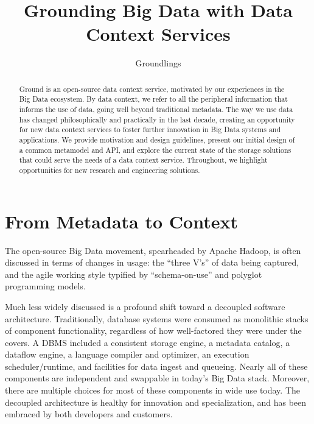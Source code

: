 \documentclass{sig-alternate}
\begin{document}
\newcommand{\smallitem}[1]{\vspace{1em}\noindent\textbf{#1}}
\newcommand{\smallitembot}{\vspace{1em}\noindent}



\title{Grounding Big Data with Data Context Services}
\author{
Groundlings
}

\maketitle

\begin{abstract}
Ground is an open-source data context service, motivated by our experiences in the Big Data ecosystem. By data context, we refer to all the peripheral information that informs the use of data, going well beyond traditional metadata.
The way we use data has changed philosophically and practically in the last decade, creating an opportunity for new data context services to foster further innovation in Big Data systems and applications. We provide motivation and design guidelines, present our initial design of a common metamodel and API, and explore the current state of the storage solutions that could serve the needs of a data context service. Throughout, we highlight opportunities for new research and engineering solutions.
\end{abstract}

\section{From Metadata to Context}
The open-source Big Data movement, spearheaded by Apache Hadoop, is often discussed in terms of changes in usage: the ``three V's'' of data being captured, and the agile working style typified by ``schema-on-use'' and polyglot programming models.

Much less widely discussed is a profound shift toward a decoupled software architecture. Traditionally, database systems were consumed as monolithic stacks of component functionality, regardless of how well-factored they were under the covers. A DBMS included a consistent storage engine, a metadata catalog, a dataflow engine, a language compiler and optimizer, an execution scheduler/runtime, and facilities for data ingest and queueing.  Nearly all of these components are independent and swappable in today's Big Data stack. Moreover, there are multiple choices for most of these components in wide use today. The decoupled architecture is healthy for innovation and specialization, and has been embraced by both developers and customers.
\end{document}
